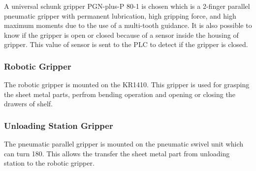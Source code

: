A universal schunk gripper PGN-plus-P 80-1 is chosen which is a 
2-finger parallel pneumatic gripper with permanent lubrication, high gripping force, and high maximum moments due to the use of a multi-tooth guidance. \cite{schunk-gripper}
It is also possible to know if the gripper is open or closed because of a sensor inside the housing of gripper. This value of sensor is sent to the PLC to detect if the gripper is closed.


\subsubsection{Robotic Gripper}
\label{subsubsec:robotic-gripper}
The robotic gripper is mounted on the KR1410. This gripper is used for grasping the sheet metal parts, perfrom bending operation and opening or closing the drawers of shelf.

\subsubsection{Unloading Station Gripper}
\label{subsubsec:unloading-gripper}
The pneumatic parallel gripper is mounted on the pneumatic swivel unit which can turn 180\textdegree. This allows the transfer the 
sheet metal part from unloading station to the robotic gripper.